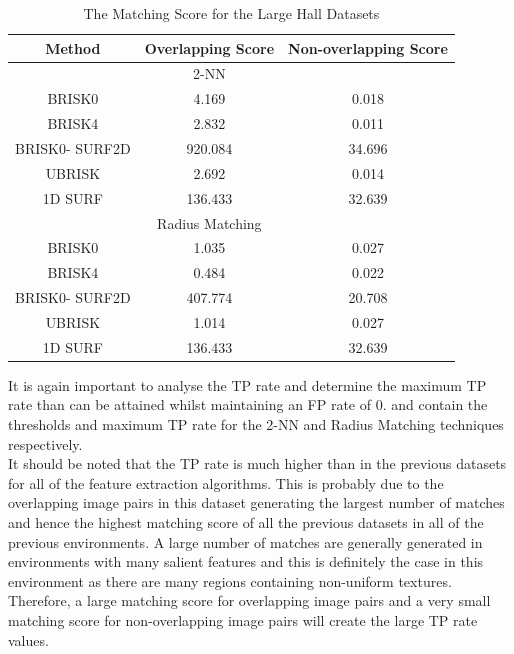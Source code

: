 \documentclass{report}
\begin{document}
\begin{table}
\caption{The Matching Score for the Large Hall Datasets}
\begin{tabular}{|c|c|c|}
\hline 
Method & Overlapping Score & Non-overlapping Score\tabularnewline
\hline 
\hline 
 & 2-NN & \tabularnewline
\hline 
BRISK0 & 4.169 & 0.018\tabularnewline
\hline 
BRISK4 & 2.832 & 0.011\tabularnewline
\hline 
BRISK0- SURF2D & 920.084 & 34.696\tabularnewline
\hline 
UBRISK & 2.692 & 0.014\tabularnewline
\hline 
1D SURF & 136.433 & 32.639\tabularnewline
\hline 
 & Radius Matching & \tabularnewline
\hline 
BRISK0 & 1.035 & 0.027\tabularnewline
\hline 
BRISK4 & 0.484 & 0.022\tabularnewline
\hline 
BRISK0- SURF2D & 407.774 & 20.708\tabularnewline
\hline 
UBRISK & 1.014 & 0.027\tabularnewline
\hline 
1D SURF & 136.433 & 32.639\tabularnewline
\hline 
\end{tabular}
\label{tab:lhMS}
\end{table}


It is again important to analyse the TP rate and determine the maximum TP rate than can be attained whilst maintaining an FP rate of $0$.  and  contain the thresholds and maximum TP rate for the 2-NN and Radius Matching techniques respectively.\\

It should be noted that the TP rate is much higher than in the previous datasets for all of the feature extraction algorithms. This is probably due to the overlapping image pairs in this dataset generating the largest number of matches and hence the highest matching score of all the previous datasets in all of the previous environments. A large number of matches are generally generated in environments with many salient features and this is definitely the case in this environment as there are many regions containing non-uniform textures. Therefore, a large matching score for overlapping image pairs and a very small matching score for non-overlapping image pairs will create the large TP rate values.\\
\end{document}

